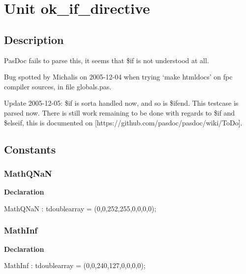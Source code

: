 \documentclass{report}
\begin{document}
\newlength{\tmplength}
\chapter{Unit ok{\_}if{\_}directive}
\section{Description}
PasDoc fails to parse this, it seems that {\$}if is not understood at all.\hfill\vspace*{1ex}



Bug spotted by Michalis on 2005{-}12{-}04 when trying `make htmldocs' on fpc compiler sources, in file globals.pas.

Update 2005{-}12{-}05: {\$}if is sorta handled now, and so is {\$}ifend. This testcase is parsed now. There is still work remaining to be done with regards to {\$}if and {\$}elseif, this is documented on [https://github.com/pasdoc/pasdoc/wiki/ToDo].
\section{Constants}
\subsection*{MathQNaN}
\begin{list}{}{
\setlength{\itemindent}{0cm}
\setlength{\listparindent}{0cm}
\setlength{\leftmargin}{\evensidemargin}
\addtolength{\leftmargin}{\tmplength}
\settowidth{\labelsep}{X}
\addtolength{\leftmargin}{\labelsep}
\setlength{\labelwidth}{\tmplength}
}
\begin{flushleft}
\item[\textbf{Declaration}\hfill]
\begin{ttfamily}
MathQNaN : tdoublearray = (0,0,252,255,0,0,0,0);\end{ttfamily}


\end{flushleft}
\end{list}
\subsection*{MathInf}
\begin{list}{}{
\setlength{\itemindent}{0cm}
\setlength{\listparindent}{0cm}
\setlength{\leftmargin}{\evensidemargin}
\addtolength{\leftmargin}{\tmplength}
\settowidth{\labelsep}{X}
\addtolength{\leftmargin}{\labelsep}
\setlength{\labelwidth}{\tmplength}
}
\begin{flushleft}
\item[\textbf{Declaration}\hfill]
\begin{ttfamily}
MathInf : tdoublearray = (0,0,240,127,0,0,0,0);\end{ttfamily}


\end{flushleft}
\end{list}
\end{document}
